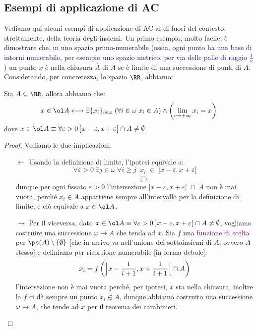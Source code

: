 \documentclass[11pt]{scrartcl}
\begin{document}
\subsection{Esempi di applicazione di AC}
Vediamo qui alcuni esempi di applicazione di AC al di fuori del contesto, strettamente, della teoria degli insiemi. Un primo esempio, molto facile, è dimostrare che, in uno spazio primo-numerabile \textcolor{MidnightBlue}{(ossia, ogni punto ha una base di intorni numerabile, per esempio uno spazio metrico, per via delle palle di raggio $\frac 1n$)} un punto $x$ è nella 
chiusura $\overline A$ di $A$ se è limite di una successione di punti di $A$. Considerando, per concretezza, lo spazio $\RR$, abbiamo:

\begin{proposition}
	Sia $A \subseteq \RR$, allora abbiamo che:
	\[ x \in \ol A \longleftrightarrow \exists \{x_i\}_{i \in \omega} \; (\forall i \in \omega \; x_i \in A) \land \left(\lim_{i \to +\infty} x_i = x\right)
		\]
	dove $x \in \ol A \equiv \forall \varepsilon > 0 \; ]x - \varepsilon, x + \varepsilon[ \; \cap\; A \ne \emptyset$.
\end{proposition}

\begin{proof}
	Vediamo le due implicazioni.
	\begin{itemize}
		\item[$\boxed{\longleftarrow}$] Usando la definizione di limite, l'ipotesi equivale a:
		\[ \forall \varepsilon > 0 \; \exists j \in \omega \; \forall i \geq j \; \underbrace{x_i}_{\in A} \in \;]x - \varepsilon, x + \varepsilon[
			\]
		dunque per ogni fissato $\varepsilon > 0$ l'intersezione $]x - \varepsilon, x + \varepsilon[ \; \cap\; A$ non è mai vuota, perché $x_i \in A$ appartiene sempre all'intervallo per la definizione di limite, e ciò equivale a $x \in \ol A$.
		\item[$\boxed{\longrightarrow}$] Per il viceversa, dato $x \in \ol A \equiv \forall \varepsilon > 0 \; ]x - \varepsilon, x + \varepsilon[ \; \cap\; A \ne \emptyset$, vogliamo costruire una successione $\omega \rightarrow A$ che tenda ad $x$.
		Sia $f$ una \textcolor{purple}{funzione di scelta} per $\ps(A) \setminus\{\emptyset\}$ [che in arrivo va nell'unione dei sottoinsiemi di $A$, ovvero $A$ stesso] e definiamo per ricorsione numerabile [in forma debole]:
		\[ x_i = f\left( \Bigr] x - \frac{1}{i + 1}, x + \frac{1}{i+1} \Bigl[ \; \cap \; A\right)
			\]
		l'intersezione non è mai vuota perché, per ipotesi, $x$ sta nella chiusura, inoltre la $f$ ci dà sempre un punto $x_i \in A$, dunque abbiamo costruito una successione $\omega \rightarrow A$, che tende ad $x$ per il teorema dei carabinieri.
	\end{itemize}
\end{proof}
\end{document}
